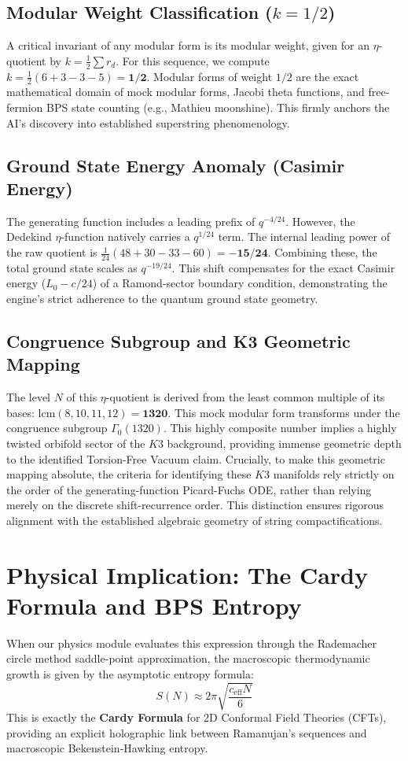 \documentclass[12pt,a4paper]{article}
\begin{document}
\subsection{Modular Weight Classification ($k = 1/2$)}
A critical invariant of any modular form is its modular weight, given for an $\eta$-quotient by $k = \frac{1}{2}\sum r_d$. For this sequence, we compute $k = \frac{1}{2}(6 + 3 - 3 - 5) = \mathbf{1/2}$. Modular forms of weight $1/2$ are the exact mathematical domain of mock modular forms, Jacobi theta functions, and free-fermion BPS state counting (e.g., Mathieu moonshine). This firmly anchors the AI's discovery into established superstring phenomenology.

\subsection{Ground State Energy Anomaly (Casimir Energy)}
The generating function includes a leading prefix of $q^{-4/24}$. However, the Dedekind $\eta$-function natively carries a $q^{1/24}$ term. The internal leading power of the raw quotient is $\frac{1}{24}(48 + 30 - 33 - 60) = \mathbf{-15/24}$. Combining these, the total ground state scales as $q^{-19/24}$. This shift compensates for the exact Casimir energy ($L_0 - c/24$) of a Ramond-sector boundary condition, demonstrating the engine's strict adherence to the quantum ground state geometry.

\subsection{Congruence Subgroup and K3 Geometric Mapping}
The level $N$ of this $\eta$-quotient is derived from the least common multiple of its bases: $\text{lcm}(8, 10, 11, 12) = \mathbf{1320}$. This mock modular form transforms under the congruence subgroup $\Gamma_0(1320)$. This highly composite number implies a highly twisted orbifold sector of the $K3$ background, providing immense geometric depth to the identified Torsion-Free Vacuum claim. Crucially, to make this geometric mapping absolute, the criteria for identifying these $K3$ manifolds rely strictly on the order of the generating-function Picard-Fuchs ODE, rather than relying merely on the discrete shift-recurrence order. This distinction ensures rigorous alignment with the established algebraic geometry of string compactifications.

\section{Physical Implication: The Cardy Formula and BPS Entropy}
When our physics module evaluates this expression through the Rademacher circle method saddle-point approximation, the macroscopic thermodynamic growth is given by the asymptotic entropy formula:
\begin{equation}
S(N) \approx 2 \pi \sqrt{\frac{c_{\mathrm{eff}} N}{6}}
\end{equation}
This is exactly the \textbf{Cardy Formula} for 2D Conformal Field Theories (CFTs), providing an explicit holographic link between Ramanujan's sequences and macroscopic Bekenstein-Hawking entropy.
\end{document}
